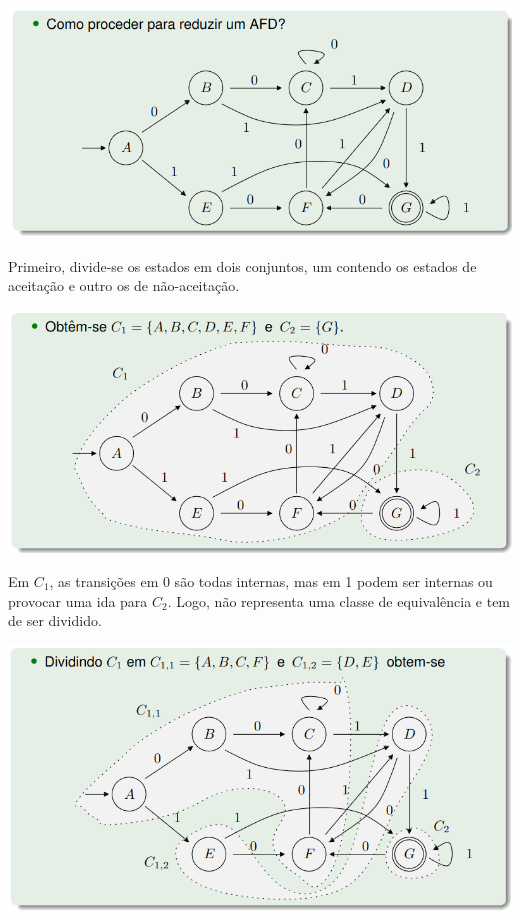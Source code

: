 \documentclass{article}
\begin{document}
\begin{flushleft}
  \begin{center}
    \includegraphics[scale=0.4]{42}
  \end{center}

  \item Primeiro, divide-se os estados em dois conjuntos, um contendo os estados
  de aceitação e outro os de não-aceitação.

  \begin{center}
    \includegraphics[scale=0.4]{43}
  \end{center}

  \item Em $C_1$, as transições em 0 são todas internas, mas em 1 podem ser internas
  ou provocar uma ida para $C_2$. Logo, não representa uma classe de equivalência e tem de ser dividido.

  \begin{center}
    \includegraphics[scale=0.395]{44}
  \end{center}


\end{flushleft}
\end{document}
